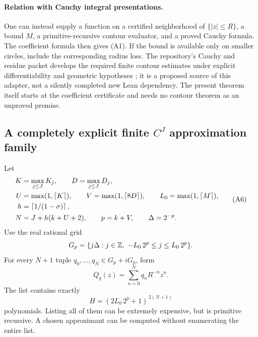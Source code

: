 \paragraph{Relation with Cauchy integral presentations.}
One can instead supply a function on a certified neighborhood of
\(\{|z|\leq R\}\), a bound \(M\), a primitive-recursive contour evaluator,
and a proved Cauchy formula. The coefficient formula then gives (A1).
If the bound is available only on smaller circles, include the corresponding
radius loss. The repository's Cauchy and residue packet develops the
required finite contour estimates under explicit differentiability and
geometric hypotheses \cite{repoCauchy}; it is a proposed source of this
adapter, not a silently completed new Lean dependency.
The present theorem itself starts at the coefficient certificate and needs
no contour theorem as an unproved premise.

\subsection{A completely explicit finite \texorpdfstring{\(C^J\)}{C-J} approximation family}

Let
\[
\begin{split}
K&=\max_{j\leq J}K_j,\qquad D=\max_{j\leq J}D_j,\\
U&=\max(1,\lceil K\rceil),\qquad
V=\max(1,\lceil8D\rceil),\qquad L_0=\max(1,\lceil M\rceil),\\
h&=\left\lceil 1/(1-\sigma)\right\rceil,\\
N&=J+h(k+U+2),\qquad p=k+V,\qquad \Delta=2^{-p}.
\end{split}
\tag{A6}
\]
Use the real rational grid
\[
       G_p=\{j\Delta:j\in\mathbb Z,\ -L_0\,2^p\leq j\leq L_0\,2^p\}.
\]
For every \(N+1\) tuple \(q_0,\ldots,q_N\in G_p+iG_p\), form
\[
                         Q_q(z)=\sum_{n=0}^N q_n R^{-n}z^n .
\tag{A7}
\]
The list contains exactly
\[
                      H=(2L_0\,2^p+1)^{\,2(N+1)}
\tag{A8}
\]
polynomials. Listing all of them can be extremely expensive, but is
primitive recursive. A chosen approximant can be computed without
enumerating the entire list.

